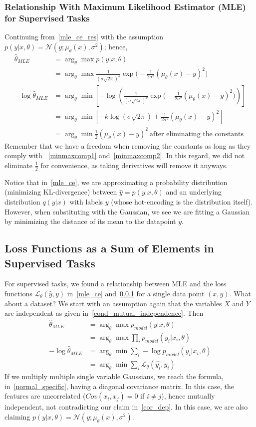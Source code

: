 \documentclass{book}
\numberwithin{equation}{subsection}
\begin{document}
\subsubsection{Relationship With Maximum Likelihood Estimator (MLE) for Supervised Tasks}
\label{mle_mse}
Continuing from~\ref{mle_ce_res} with the assumption $p(y|x,\theta) = \mathcal{N}(y; \mu_\theta(x),\sigma^2)$; hence,
\begin{align}
    \hat{\theta}_{MLE}
    &= \arg_\theta \max p(y|x,\theta)\\
    &= \arg_\theta \max \frac{1}{(\sigma\sqrt{2\pi})^k}\exp\Big(-\frac{1}{2\sigma^2}(\mu_\theta(x)-y)^2\Big)\\
    -\log\hat{\theta}_{MLE} &= \arg_\theta\min\left[-\log\left(\frac{1}{(\sigma\sqrt{2\pi})^k}\exp\Big(-\frac{1}{2\sigma^2}(\mu_\theta(x)-y)^2\Big)\right)\right]\\
    &= \arg_\theta\min[-k\log(\sigma\sqrt{2\pi}) + \frac{1}{2\sigma^2}(\mu_\theta(x)-y)^2]\\
    &= \arg_\theta \min\frac{1}{2}(\mu_\theta(x)-y)^2\ \text{after eliminating the constants}
    \label{mse_derivation_res1}
\end{align}
Remember that we have a freedom when removing the constants as long as they comply with ~\ref{minmaxcomp1} and~\ref{minmaxcomp2}. In this regard, we did not eliminate $\frac{1}{2}$ for convenience, as taking derivatives will remove it anyways.

Notice that in~\ref{mle_ce}, we are approximating a probability distribution (minimizing KL-divergence) between $\hat{y} = p(y|x,\theta)$ and an underlying distribution $q(y|x)$ with labels $y$ (whose hot-encoding is the distribution itself). However, when substituting with the Gaussian, we see we are fitting a Gaussian by minimizing the distance of its mean to the datapoint $y$.
\subsection{Loss Functions as a Sum of Elements in Supervised Tasks}
For supervised tasks, we found a relationship between MLE and the loss functions $\mathcal{L}_\theta(\hat{y},y)$ in~\ref{mle_ce} and~\ref{mle_mse} for a single data point $(x,y)$. What about a dataset? We start with an assumption again that the variables $X$ and $Y$ are independent as given in~\ref{cond_mutual_independence}. Then
\begin{align}
    \hat{\theta}_{MLE}
    &= \arg_\theta \max p_{model}(y|x,\theta)\\
    &= \arg_\theta \max \prod_i p_{model}(y_i|x_i,\theta)\\
    -\log\hat{\theta}_{MLE}
    &= \arg_\theta \min \sum_i -\log p_{model}(y_i|x_i,\theta)\\
    &= \arg_\theta \min \sum_i \mathcal{L}_\theta(\hat{y_i},y_i)\label{loss_sum_res}
\end{align}
If we multiply multiple single variable Gaussians, we reach the formula, in~\ref{normal_specific}, having a diagonal covariance matrix. In this case, the features are uncorrelated ($Cov(x_i,x_j)=0$ if $i \neq j$), hence mutually independent, not contradicting our claim in~\ref{cor_dep}. In this case, we are also claiming $p(y|x,\theta)=\mathcal{N}(y; \mu_\theta(x),\sigma^2)$.
\end{document}
